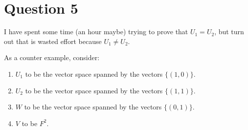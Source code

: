 \section*{Question 5}
I have spent some time (an hour maybe) trying to prove that $ U_1 = U_2 $, but turn out that is wasted effort because $ U_1 \ne U_2 $.

As a counter example, consider:
\begin{enumerate}
  \item {$ U_1 $ to be the vector space spanned by the vectors $ \{ (1, 0) \} $.}
  \item {$ U_2 $ to be the vector space spanned by the vectors $ \{ (1, 1) \} $.}
  \item {$ W $ to be the vector space spanned by the vectors $ \{ (0, 1) \} $.}
  \item {$ V $ to be $ F^2 $.}
\end{enumerate}